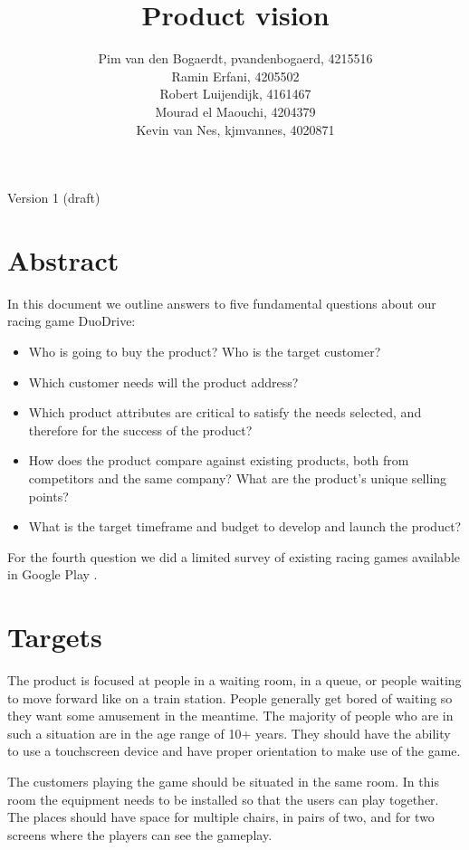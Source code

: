 \documentclass[11pt,twoside,a4paper]{article}
\title{Product vision}
\author{
	Pim van den Bogaerdt, pvandenbogaerd, 4215516\\
	Ramin Erfani, 4205502\\
	Robert Luijendijk, 4161467\\
	Mourad el Maouchi, 4204379\\
	Kevin van Nes, kjmvannes, 4020871
}
\begin{document}
\maketitle
\begin{center}
Version 1 (draft)
\end{center}
\clearpage

\section*{Abstract}
In this document we outline answers to five fundamental questions \cite{pichler} about our racing game DuoDrive:

\begin{itemize}
\item Who is going to buy the product? Who is the target customer? 
\item Which customer needs will the product address? 
\item Which product attributes are critical to satisfy the needs selected, and therefore for the success of the product? 
\item How does the product compare against existing products, both from competitors and the same company? What are the product’s unique selling points? 
\item What is the target timeframe and budget to develop and launch the product?
\end{itemize}

For the fourth question we did a limited survey of existing racing games available in Google Play \cite{googleplay}.

\clearpage
\tableofcontents

\clearpage

\section{Targets}
The product is focused at people in a waiting room, in a queue, or people waiting to move forward like on a train station. People generally get bored of waiting so they want some amusement in the meantime. The majority of people who are in such a situation are in the age range of 10+ years. They should have the ability to use a touchscreen device and have proper orientation to make use of the game.

The customers playing the game should be situated in the same room. In this room the equipment needs to be installed so that the users can play together. The places should have space for multiple chairs, in pairs of two, and for two screens where the players can see the gameplay.
\end{document}
